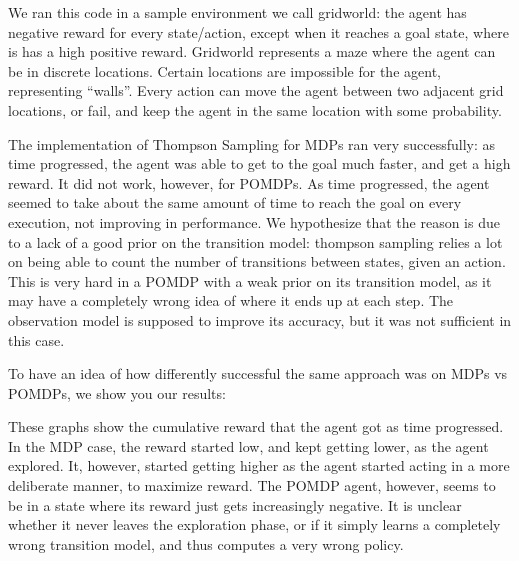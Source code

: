 \documentclass{pset}
\begin{document}
We ran this code in a sample environment we call gridworld: the agent has negative
reward for every state/action, except when it reaches a goal state, where is has
a high positive reward.
Gridworld represents a maze where the agent can be in discrete locations. Certain
locations are impossible for the agent, representing ``walls''. Every action can
move the agent between two adjacent grid locations, or fail, and keep the agent in
the same location with some probability.

The implementation of Thompson Sampling for MDPs ran very successfully: as time
progressed, the agent was able to get to the goal much faster, and get a high
reward. It did not work, however, for POMDPs. As time progressed, the agent seemed
to take about the same amount of time to reach the goal on every execution, not
improving in performance. We hypothesize that the reason is due to a lack of
a good prior on the transition model: thompson sampling relies a lot on being
able to count the number of transitions between states, given an action. This
is very hard in a POMDP with a weak prior on its transition model, as it may have
a completely wrong idea of where it ends up at each step. The observation model
is supposed to improve its accuracy, but it was not sufficient in this case.

To have an idea of how differently successful the same approach was on MDPs vs
POMDPs, we show you our results:


These graphs show the cumulative reward that the agent got as time progressed.
In the MDP case, the reward started low, and kept getting lower, as the agent
explored. It, however, started getting higher as the agent started acting in a
more deliberate manner, to maximize reward. The POMDP agent, however, seems to
be in a state where its reward just gets increasingly negative. It is unclear
whether it never leaves the exploration phase, or if it simply learns a completely
wrong transition model, and thus computes a very wrong policy.





\end{document}
